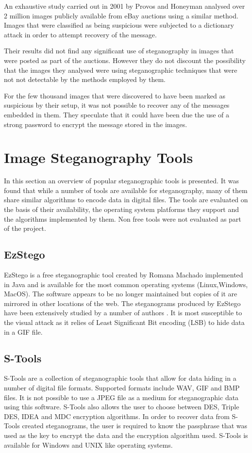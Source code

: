 An exhaustive study carried out in 2001 by Provos and Honeyman \cite{provos2001detecting} analysed over 2 million images publicly available from eBay auctions using a similar method. Images that were classified as being suspicious were subjected to a dictionary attack in order to attempt recovery of the message.
\par Their results did not find any significant use of steganography in images that were posted as part of the auctions. However they do not discount the possibility that the images they analysed were using steganographic techniques that were not not detectable by the methods employed by them.
\par For the few thousand images that were discovered to have been marked as suspicious by their setup, it was not possible to recover any of the messages embedded in them.  They speculate that it could have been due the use of a strong password to encrypt the message stored in the images.

\section{Image Steganography Tools}
\label{sec:tools}
In this section an overview of popular steganographic tools is presented. It was found that while a number of tools are available for steganography, many of them share similar algorithms to encode data in digital files.  The tools are evaluated on the basis of their availability, the operating system platforms they support and the algorithms implemented by them. Non free tools were not evaluated as part of the project. 
\subsection{EzStego}
EzStego \cite{ezstego} is a free steganographic tool created by Romana Machado  implemented in Java and is available for the most common operating systems (Linux,Windows, MacOS). The software appears to be no longer maintained but copies of it are mirrored in other locations of the web. The steganograms produced by EzStego have been extensively studied by a number of authors  \cite{westfeld2000attacks, farid2002detecting}. It is most susceptible to the visual attack as it relies of Least Significant Bit encoding (LSB) to hide data in a GIF file. 
\subsection{S-Tools}
S-Tools \cite{stools} are a collection of steganographic tools that allow for data hiding in a number of digital file formats. Supported formats include WAV, GIF and BMP files. It is not possible to use a JPEG file as a medium for steganographic data using this software.  S-Tools also allows the user to choose between DES, Triple DES, IDEA and MDC encryption algorithms. In order to recover data from S-Tools created steganograms,  the user is required to know the passphrase that was used as the key to encrypt the data and the encryption algorithm used.  S-Tools is available for Windows and UNIX like operating systems.
